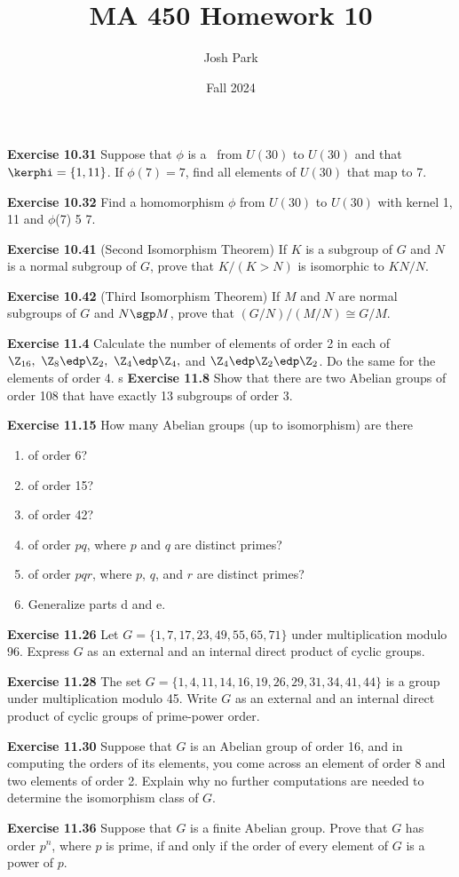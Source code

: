 \documentclass{article}
\author{Josh Park}
\date{\vspace*{-1em}Fall 2024}
\title{\vspace*{-2em}MA 450 Homework 10\vspace*{-1em}}
\begin{document}
\maketitle
\textbf{Exercise 10.31} Suppose that \(\phi\) is a \homo\ from \(U(30)\) to \(U(30)\) and that \(\kerphi = \{1,11\}\). If \(\phi(7) = 7\), find all elements of \(U(30)\) that map to 7.
\newpage

\textbf{Exercise 10.32} Find a homomorphism \(\phi\) from $U(30)$ to $U(30)$ with kernel {1, 11} and $\phi$(7) 5 7.
\newpage

\textbf{Exercise 10.41} (Second Isomorphism Theorem) If $K$ is a subgroup of $G$ and $N$ is a normal subgroup of $G$, prove that $K/(K > N)$ is isomorphic to $KN/N$.
\newpage

\textbf{Exercise 10.42} (Third Isomorphism Theorem) If $M$ and $N$ are normal subgroups of $G$ and $N \sgp M$, prove that $(G/N)/(M/N) \cong G/M$.
\newpage

\textbf{Exercise 11.4} Calculate the number of elements of order 2 in each of $\Z_{16},\ \Z_{8} \edp \Z_{2},\ \Z_{4} \edp \Z_{4},$ and $\Z_{4} \edp \Z_{2} \edp \Z_{2}$. Do the same for the elements of order 4.
\newpage
s
\textbf{Exercise 11.8} Show that there are two Abelian groups of order 108 that have exactly 13 subgroups of order 3.
\newpage

\textbf{Exercise 11.15} How many Abelian groups (up to isomorphism) are there \vspace{-15pt}
\newpage

\begin{enumerate}[label=\textbf{\alph*.}]
    \item of order 6?
    \item of order 15?
    \item of order 42?
    \item of order \(pq\), where \(p\) and \(q\) are distinct primes?
    \item of order $pqr$, where $p$, $q$, and $r$ are distinct primes?
    \item Generalize parts d and e.
\end{enumerate}

\textbf{Exercise 11.26} Let $G = \{1, 7, 17, 23, 49, 55, 65, 71\}$ under multiplication modulo 96. Express $G$ as an external and an internal direct product of cyclic groups.
\newpage

\textbf{Exercise 11.28} The set $G = \{1, 4, 11, 14, 16, 19, 26, 29, 31, 34, 41, 44\}$ is a group under multiplication modulo 45. Write $G$ as an external and an internal direct product of cyclic groups of prime-power order.
\newpage

\textbf{Exercise 11.30} Suppose that $G$ is an Abelian group of order 16, and in computing the orders of its elements, you come across an element of order 8 and two elements of order 2. Explain why no further computations are needed to determine the isomorphism class of $G$.
\newpage

\textbf{Exercise 11.36} Suppose that $G$ is a finite Abelian group. Prove that $G$ has order $p^n$, where $p$ is prime, if and only if the order of every element of $G$ is a power of $p$.
\newpage
\end{document}
